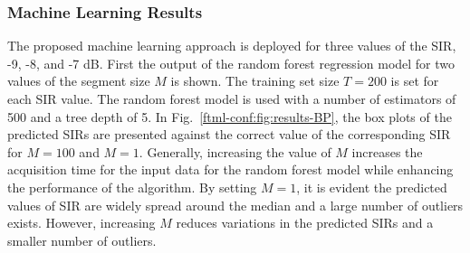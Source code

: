 \subsubsection{Machine Learning Results}\label{ftml-conf:sec:results-ML}
The proposed machine learning approach is deployed for three values of the SIR, -9, -8, and -7 dB. First the output of the random forest regression model for two values of the segment size $M$ is shown. The training set size $T=200$ is set for each SIR value. The random forest model is used with a number of estimators of 500 and a tree depth of 5. In Fig.~\ref{ftml-conf:fig:results-BP}, the box plots of the predicted SIRs are presented against the correct value of the corresponding SIR for $M=100$ and $M=1$.  Generally, increasing the value of $M$ increases the acquisition time for the input data for the random forest model while enhancing the performance of the algorithm. By setting $M=1$, it is evident the predicted values of SIR are widely spread around the median and a large number of outliers exists. However, increasing $M$ reduces variations in the predicted SIRs and a smaller number of outliers.



